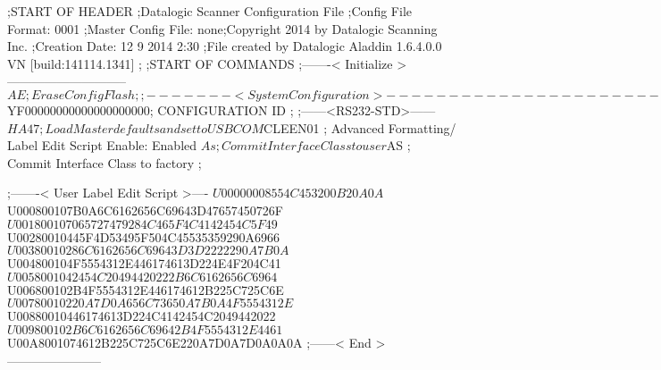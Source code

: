 ;START OF HEADER
;Datalogic Scanner Configuration File
;Config File Format: 0001
;Master Config File: none;Copyright 2014 by Datalogic Scanning Inc.
;Creation Date: 12 9 2014 2:30
;File created by Datalogic Aladdin 1.6.4.0.0 VN [build:141114.1341]
;
;START OF COMMANDS
;-------< Initialize >-----------------------------
$AE                 ; Erase Config Flash
;
;-------< System Configuration >-------------------------------
$YF00000000000000000000; CONFIGURATION ID
;
;------<RS232-STD>------
$HA47               ; Load Master defaults and set to USBCOM
$CLEEN01            ; Advanced Formatting/ Label Edit Script Enable: Enabled
$As                 ; Commit Interface Class to user
$AS                 ; Commit Interface Class to factory
;

;-------< User Label Edit Script >----
$U00000008554C453200B20A0A
$U000800107B0A6C6162656C69643D47657450726F
$U001800107065727479284C465F4C4142454C5F49
$U00280010445F4D53495F504C45535359290A6966
$U00380010286C6162656C69643D3D2222290A7B0A
$U004800104F5554312E446174613D224E4F204C41
$U0058001042454C20494420222B6C6162656C6964
$U006800102B4F5554312E446174612B225C725C6E
$U00780010220A7D0A656C73650A7B0A4F5554312E
$U00880010446174613D224C4142454C2049442022
$U009800102B6C6162656C69642B4F5554312E4461
$U00A8001074612B225C725C6E220A7D0A7D0A0A0A
;------< End >-----------------------
